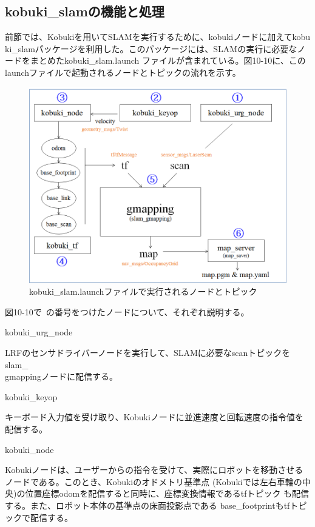 \subsection{kobuki\_slamの機能と処理}

前節では、Kobukiを用いてSLAMを実行するために、kobukiノードに加えてkobu\\ki\_slamパッケージを利用した。このパッケージには、SLAMの実行に必要なノードをまとめたkobuki\_slam.launch ファイルが含まれている。図10-10に、このlaunchファイルで起動されるノードとトピックの流れを示す。

\begin{figure}[htp]
  \centering
  \includegraphics[width=12cm]{pictures/chapter10/pic_10_10.png}
  \caption{kobuki\_slam.launchファイルで実行されるノードとトピック}
\end{figure}

図10-10で~の番号をつけたノードについて、それぞれ説明する。

\setcounter{num}{0}

\circled{\thenum} kobuki\_urg\_node

LRFのセンサドライバーノードを実行して、SLAMに必要なscanトピックをslam\_\\gmappingノードに配信する。

\circled{\thenum} kobuki\_keyop

キーボード入力値を受け取り、Kobukiノードに並進速度と回転速度の指令値を配信する。

\circled{\thenum} kobuki\_node

Kobukiノードは、ユーザーからの指令を受けて、実際にロボットを移動させるノードである。このとき、Kobukiのオドメトリ基準点 (Kobukiでは左右車輪の中央)の位置座標odomを配信すると同時に、座標変換情報であるtfトピック  も配信する。また、ロボット本体の基準点の床面投影点である  base\_footprintもtfトピックで配信する。

